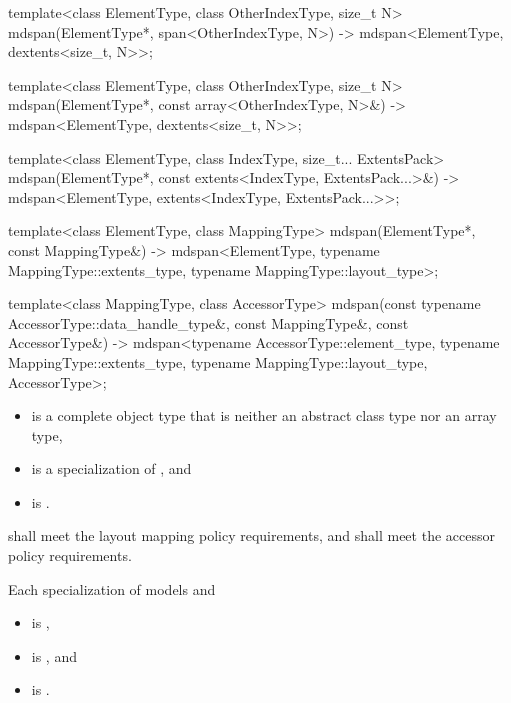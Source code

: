 \begin{codeblock}
{  template<class ElementType, class OtherIndexType, size_t N>
    mdspan(ElementType*, span<OtherIndexType, N>)
      -> mdspan<ElementType, dextents<size_t, N>>;

  template<class ElementType, class OtherIndexType, size_t N>
    mdspan(ElementType*, const array<OtherIndexType, N>&)
      -> mdspan<ElementType, dextents<size_t, N>>;

  template<class ElementType, class IndexType, size_t... ExtentsPack>
    mdspan(ElementType*, const extents<IndexType, ExtentsPack...>&)
      -> mdspan<ElementType, extents<IndexType, ExtentsPack...>>;

  template<class ElementType, class MappingType>
    mdspan(ElementType*, const MappingType&)
      -> mdspan<ElementType, typename MappingType::extents_type,
                typename MappingType::layout_type>;

  template<class MappingType, class AccessorType>
    mdspan(const typename AccessorType::data_handle_type&, const MappingType&,
           const AccessorType&)
      -> mdspan<typename AccessorType::element_type, typename MappingType::extents_type,
                typename MappingType::layout_type, AccessorType>;
}
\end{codeblock}

\pnum
\mandates
\begin{itemize}
\item
{} is a complete object type
that is neither an abstract class type nor an array type,
\item
{} is a specialization of , and
\item
{}
is .
\end{itemize}

\pnum
{} shall meet
the layout mapping policy requirements, and
 shall meet
the accessor policy requirements.

\pnum
Each specialization  of  models  and
\begin{itemize}
\item
{} is ,
\item
{} is , and
\item
{} is .
\end{itemize}

